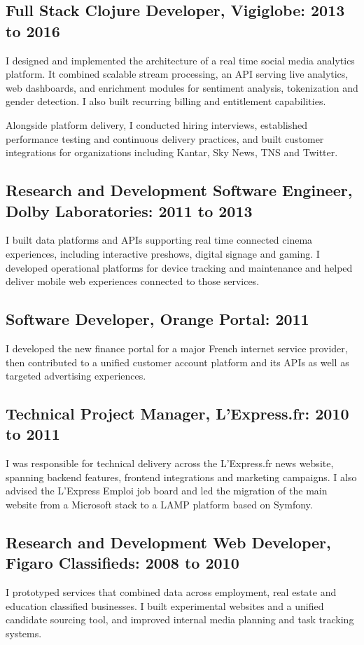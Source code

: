 \documentclass{article}
\begin{document}
\subsection*{Full Stack Clojure Developer, Vigiglobe: 2013 to 2016}
I designed and implemented the architecture of a real time social media analytics platform. It combined scalable stream processing, an API serving live analytics, web dashboards, and enrichment modules for sentiment analysis, tokenization and gender detection. I also built recurring billing and entitlement capabilities.

Alongside platform delivery, I conducted hiring interviews, established performance testing and continuous delivery practices, and built customer integrations for organizations including Kantar, Sky News, TNS and Twitter.

\subsection*{Research and Development Software Engineer, Dolby Laboratories: 2011 to 2013}
I built data platforms and APIs supporting real time connected cinema experiences, including interactive preshows, digital signage and gaming. I developed operational platforms for device tracking and maintenance and helped deliver mobile web experiences connected to those services.

\subsection*{Software Developer, Orange Portal: 2011}
I developed the new finance portal for a major French internet service provider, then contributed to a unified customer account platform and its APIs as well as targeted advertising experiences.

\subsection*{Technical Project Manager, L'Express.fr: 2010 to 2011}
I was responsible for technical delivery across the L'Express.fr news website, spanning backend features, frontend integrations and marketing campaigns. I also advised the L'Express Emploi job board and led the migration of the main website from a Microsoft stack to a LAMP platform based on Symfony.

\subsection*{Research and Development Web Developer, Figaro Classifieds: 2008 to 2010}
I prototyped services that combined data across employment, real estate and education classified businesses. I built experimental websites and a unified candidate sourcing tool, and improved internal media planning and task tracking systems.
\end{document}
